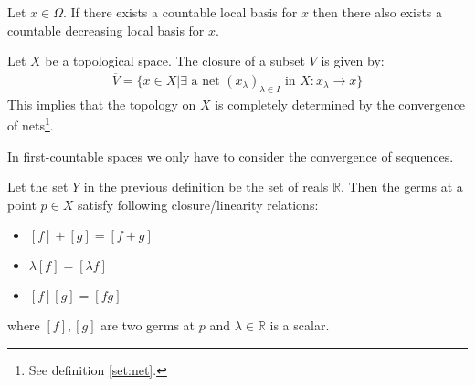     \begin{property}
        Let $x\in\Omega$. If there exists a countable local basis for $x$ then there also exists a countable decreasing local basis for $x$.
    \end{property}


    \begin{property}
            Let $X$ be a topological space. The closure of a subset $V$ is given by:
            \begin{gather}
                \label{topology:closure}
                \overline{V} = \{x\in X| \exists \text{ a net } (x_\lambda)_{\lambda\in I} \text{ in } X:x_\lambda\rightarrow x\}
            \end{gather}
            This implies that the topology on $X$ is completely determined by the convergence of nets\footnote{See definition \ref{set:net}.}.
    \end{property}
    \begin{result}
            In first-countable spaces we only have to consider the convergence of sequences.
    \end{result}


    \begin{property}
        Let the set $Y$ in the previous definition be the set of reals $\mathbb{R}$. Then the germs at a point $p\in X$ satisfy following closure/linearity relations:
        \begin{itemize}
            \item $[f] + [g] = [f+g]$
            \item $\lambda[f] = [\lambda f]$
            \item $[f][g] = [fg]$
        \end{itemize}
        where $[f], [g]$ are two germs at $p$ and $\lambda\in\mathbb{R}$ is a scalar.
    \end{property}

